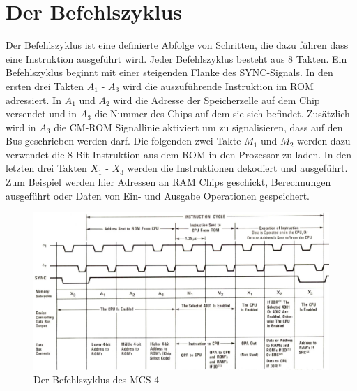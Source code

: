 \section{Der Befehlszyklus}
\label{ch:befehlszyklus}
Der Befehlszyklus ist eine definierte Abfolge von Schritten, die dazu führen dass eine Instruktion ausgeführt wird. Jeder Befehlszyklus besteht aus 8 Takten. Ein Befehlszyklus beginnt mit einer steigenden Flanke des SYNC-Signals. In den ersten drei Takten $A_1$ - $A_3$ wird die auszuführende Instruktion im ROM adressiert. In $A_1$ und $A_2$ wird die Adresse der Speicherzelle auf dem Chip versendet und in $A_3$ die Nummer des Chips auf dem sie sich befindet. Zusätzlich wird in $A_3$ die CM-ROM Signallinie aktiviert um zu signalisieren, dass auf den Bus geschrieben werden darf. Die folgenden zwei Takte $M_1$ und $M_2$ werden dazu verwendet die 8 Bit Instruktion aus dem ROM in den Prozessor zu laden. In den letzten drei Takten $X_1$ - $X_3$ werden die Instruktionen dekodiert und ausgeführt. Zum Beispiel werden hier Adressen an RAM Chips geschickt, Berechnungen ausgeführt oder Daten von Ein- und Ausgabe Operationen gespeichert.
 \begin{figure}[ht]
 	\centering
 	\includegraphics[width=1\textwidth]{figures/instruction_cycle.png}
 	\caption{Der Befehlszyklus des MCS-4}
 	\label{fig:cycle}
 \end{figure}

